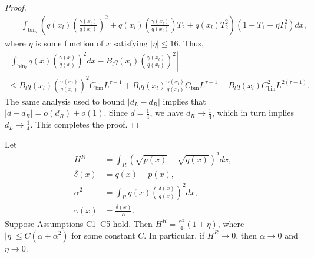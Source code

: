\documentclass{article}
\newcommand{\bin}{\text{bin}}
\begin{document}
\begin{proof}
\begin{align*}
 =& \int_{\bin_l} \left( q(x_l) \left( \frac{\gamma(x_l)}{q(x_l)} \right)^2 + 
                q(x_l) \left( \frac{\gamma(x_l)}{q(x_l)} \right) T_2 + q(x_l) T_2^2 \right) 
    (1 - T_1 + \eta T_1^2) dx,
\end{align*}
where $\eta$ is some function of $x$ satisfying $|\eta| \leq 16$. Thus,
\begin{multline*}
\left| \int_{\bin_l} q(x) \left( \frac{\gamma(x)}{q(x)} \right)^2 dx - 
      B_l q(x_l) \left( \frac{\gamma(x_l)}{q(x_l)} \right)^2 \right| \\
%
\leq   B_l q(x_l) \left( \frac{\gamma(x_l)}{q(x_l)} \right)^2 C_\bin L^{\tau-1} +
      B_l q(x_l) \frac{\gamma(x_l)}{q(x_l)} C_\bin L^{\tau-1} + B_l q(x_l) C_\bin^2 L^{2(\tau-1)}. 
\end{multline*}
The same analysis used to bound $|d_L-d_R|$ implies that
$|d - d_R| = o(d_R) + o(1)$.
Since $d = \frac{1}{4}$, we have $d_R \to \frac{1}{4}$, which in turn implies $d_L \to \frac{1}{4}$. This completes the proof.
\end{proof}





\begin{lemma}
\label{prop:continuous_hellinger_chi_square}
Let
\begin{align*}
H^R & = \int_R (\sqrt{p(x)} - \sqrt{q(x)})^2 dx, \\
%
\delta(x) & = q(x) - p(x), \\
%
\alpha^2 & = \int_R q(x) \left( \frac{\delta(x)}{q(x)} \right)^2 dx, \\
%
\gamma(x) & = \frac{\delta(x)}{\alpha}.
\end{align*}
Suppose Assumptions C1--C5 hold. Then $H^R = \frac{\alpha^2}{4}(1 + \eta)$,
where $|\eta| \leq C(\alpha + \alpha^2)$ for some constant $C$. In particular, if $H^R \rightarrow 0$, then $\alpha \rightarrow 0$ and $\eta \rightarrow 0$. 
\end{lemma}
\end{document}
